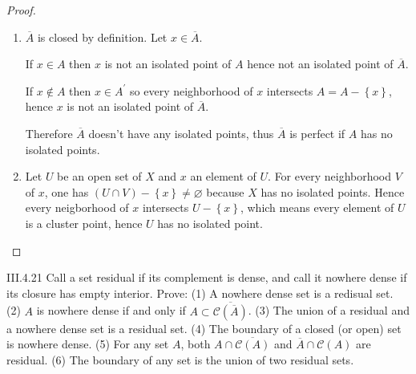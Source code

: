 \begin{proof}
	\begin{enumerate}[label={(\arabic*)}]
		\item \( \overline{A} \) is closed by definition. Let \( x \in \overline{A} \).

		      If \( x \in A \) then \(x\) is not an isolated point of \(A\) hence not an isolated point of \(\overline{A}\).

		      If \( x \notin A \) then \( x \in A^{\prime} \) so every neighborhood of \(x\) intersects \( A = A - \left\{x\right\} \), hence \(x\) is not an isolated point of \(\overline{A}\).

		      Therefore \(\overline{A}\) doesn't have any isolated points, thus \(\overline{A}\) is perfect if \(A\) has no isolated points.
		\item Let \(U\) be an open set of \(X\) and \(x\) an element of \(U\). For every neighborhood \(V\) of \(x\), one has \( (U \cap V) - \left\{x\right\} \ne \varnothing \) because \(X\) has no isolated points. Hence every neigborhood of \(x\) intersects \( U - \left\{x\right\} \), which means every element of \(U\) is a cluster point, hence \(U\) has no isolated point.
	\end{enumerate}
\end{proof}

\begin{problem}{III.4.21}
Call a set residual if its complement is dense, and call it nowhere dense if its closure has empty interior. Prove: (1) A nowhere dense set is a redisual set. (2) \(A\) is nowhere dense if and only if \( A \subset \overline{\mathscr{C}(\overline{A})} \). (3) The union of a residual and a nowhere dense set is a residual set. (4) The boundary of a closed (or open) set is nowhere dense. (5) For any set \(A\), both \(A \cap \overline{\mathscr{C}(A)}\) and \( \overline{A} \cap \mathscr{C}(A) \) are residual. (6) The boundary of any set is the union of two residual sets.
\end{problem}

